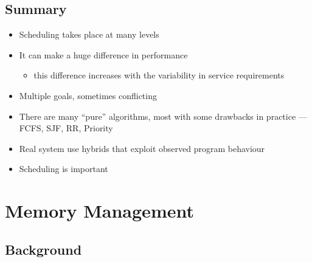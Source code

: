 \documentclass[11pt,a4paper]{article}
\begin{document}
\subsection{Summary}
\begin{itemize}
    \item Scheduling takes place at many levels
    \item It can make a huge difference in performance
        \begin{itemize}
            \item this difference increases with the variability in service requirements
        \end{itemize}
    \item Multiple goals, sometimes conflicting
    \item There are many ``pure'' algorithms, most with some drawbacks in practice ---
        FCFS, SJF, RR, Priority
    \item Real system use hybrids that exploit observed program behaviour
    \item Scheduling is important
\end{itemize}

\break{}

\section{Memory Management}

\subsection{Background}
\end{document}
